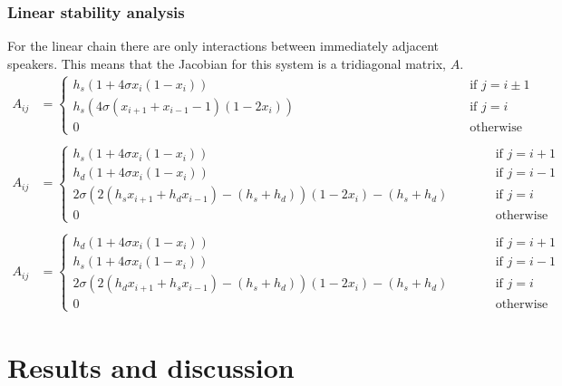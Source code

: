 \documentclass[12pt]{article}
\begin{document}
\subsubsection{Linear stability analysis}
For the linear chain there are only interactions between immediately adjacent speakers. This means that the Jacobian for this system is a tridiagonal matrix, $A$. 
\begin{align*}
A_{ij} &=
\begin{cases}
h_s \left(1 + 4\sigma x_i \left( 1 - x_i \right) \right) & \phantom{blaaaaaaaaaaaaaaaaaaaaahh} \text{if $j = i \pm 1$}
%
%
\\ h_s \left( 4 \sigma \left( x_{i+1} + x_{i-1} -1 \right) \left( 1 - 2 x_i \right) \right) & \phantom{blaaaaaaaaaaaaaaaaaaaaahh}  \text{if $j = i$}
%
%
\\ 0 & \phantom{blaaaaaaaaaaaaaaaaaaaaahh}  \text{otherwise}
\end{cases}
\\\quad
\\
A_{ij} &= 
\begin{cases}
h_s \left(1 + 4\sigma x_i \left( 1 - x_i \right) \right) & \phantom{blaahh} \text{if $j = i + 1$}
%
%
\\ h_d \left(1 + 4\sigma x_i \left( 1 - x_i \right) \right) & \phantom{blaahh} \text{if $j = i - 1$}
%
%
\\ 2 \sigma \left(  2 \left( h_s x_{i+1} + h_d x_{i-1} \right) - \left( h_s+h_d \right) \right) \left(1-2x_i\right) - \left( h_s+h_d \right) & \phantom{blaahh} \text{if $j = i$}
%
%
\\ 0 & \phantom{blaahh} \text{otherwise}
\end{cases}
\\ \quad
\\
A_{ij} &= 
\begin{cases}
h_d \left(1 + 4\sigma x_i \left( 1 - x_i \right) \right) & \phantom{blaahh} \text{if $j = i + 1$}
%
%
\\ h_s \left(1 + 4\sigma x_i \left( 1 - x_i \right) \right) & \phantom{blaahh} \text{if $j = i - 1$}
%
%
\\ 2 \sigma \left(  2 \left( h_d x_{i+1} + h_s x_{i-1} \right) - \left( h_s+h_d \right) \right) \left(1-2x_i\right) - \left( h_s+h_d \right) & \phantom{blaahh} \text{if $j = i$}
%
%
\\ 0 & \phantom{blaahh} \text{otherwise}
\end{cases}
\end{align*}

\newpage
\section{Results and discussion}
\end{document}
